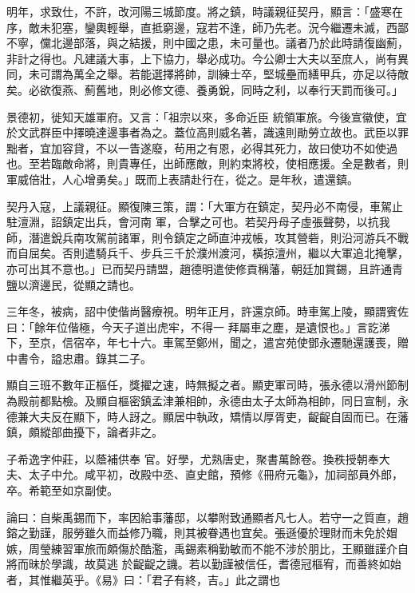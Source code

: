 \begin{pinyinscope}
 明年，求致仕，不許，改河陽三城節度。將之鎮，時議親征契丹，顯言：「盛寒在
 序，敵未犯塞，鑾輿輕舉，直抵窮邊，寇若不逢，師乃先老。況今繼遷未滅，西鄙不寧，儻北邊部落，與之結援，則中國之患，未可量也。議者乃於此時請復幽薊，非計之得也。凡建議大事，上下協力，舉必成功。今公卿士大夫以至庶人，尚有異同，未可謂為萬全之舉。若能選擇將帥，訓練士卒，堅城壘而繕甲兵，亦足以待敵矣。必欲復燕、薊舊地，則必修文德、養勇銳，同時之利，以奉行天罰而後可。」



 景德初，徙知天雄軍府。又言：「祖宗以來，多命近臣
 統領軍旅。今後宣徽使，宜於文武群臣中擇曉達邊事者為之。蓋位高則威名著，識遠則勛勞立故也。武臣以罪黜者，宜加容貸，不以一眚遂廢，茍用之有恩，必得其死力，故曰使功不如使過也。至若臨敵命將，則貴專任，出師應敵，則約束將校，使相應援。全是數者，則軍威倍壯，人心增勇矣。」既而上表請赴行在，從之。是年秋，遣還鎮。



 契丹入寇，上議親征。顯復陳三策，謂：「大軍方在鎮定，契丹必不南侵，車駕止駐澶淵，詔鎮定出兵，會河南
 軍，合擊之可也。若契丹母子虛張聲勢，以抗我師，潛遣銳兵南攻駕前諸軍，則令鎮定之師直沖戎帳，攻其營砦，則沿河游兵不戰而自屈矣。否則遣騎兵千、步兵三千於濮州渡河，橫掠澶州，繼以大軍追北掩擊，亦可出其不意也。」已而契丹請盟，趙德明遣使修貢稱藩，朝廷加賞錫，且許通青鹽以濟邊民，從顯之請也。



 三年冬，被病，詔中使偕尚醫療視。明年正月，許還京師。時車駕上陵，顯謂賓佐曰：「餘年位偕極，今天子道出虎牢，不得一
 拜屬車之塵，是遺恨也。」言訖涕下，至京，信宿卒，年七十六。車駕至鄭州，聞之，遣宮苑使鄧永遷馳還護喪，贈中書令，謚忠肅。錄其二子。



 顯自三班不數年正樞任，獎擢之速，時無擬之者。顯吏軍司時，張永德以滑州節制為殿前都點檢。及顯自樞密鎮孟津兼相帥，永德由太子太師為相帥，同日宣制，永德兼大夫反在顯下，時人訝之。顯居中執政，矯情以厚胥吏，齪齪自固而已。在藩鎮，頗縱部曲擾下，論者非之。



 子希逸字仲莊，以蔭補供奉
 官。好學，尤熟唐史，聚書萬餘卷。換秩授朝奉大夫、太子中允。咸平初，改殿中丞、直史館，預修《冊府元龜》，加祠部員外郎，卒。希範至如京副使。



 論曰：自柴禹錫而下，率因給事藩邸，以攀附致通顯者凡七人。若守一之質直，趙鎔之勤謹，服勞雖久而益修乃職，則其被眷遇也宜矣。張遜優於理財而未免於媢嫉，周瑩練習軍旅而頗傷於酷濫，禹錫素稱勤敏而不能不涉於朋比，王顯雖謹介自將而昧於學識，故莫逃
 於齪齪之譏。若以勤謹被信任，耆德冠樞宥，而善終如始者，其惟繼英乎。《易》曰：「君子有終，吉。」此之謂也



\end{pinyinscope}